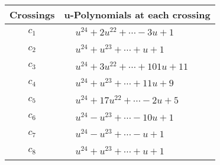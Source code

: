 \documentclass[1p]{elsarticle_modified}
\theoremstyle{definition}
\begin{document}
\begin{tabular}{m{50pt}|m{274pt}}
Crossings & \hspace{64pt}u-Polynomials at each crossing \\
\hline $$\begin{aligned}c_{1}\end{aligned}$$&$\begin{aligned}
&u^{24}+2 u^{22}+\cdots-3 u+1
\end{aligned}$\\
\hline $$\begin{aligned}c_{2}\end{aligned}$$&$\begin{aligned}
&u^{24}+u^{23}+\cdots+u+1
\end{aligned}$\\
\hline $$\begin{aligned}c_{3}\end{aligned}$$&$\begin{aligned}
&u^{24}+3 u^{22}+\cdots+101 u+11
\end{aligned}$\\
\hline $$\begin{aligned}c_{4}\end{aligned}$$&$\begin{aligned}
&u^{24}+u^{23}+\cdots+11 u+9
\end{aligned}$\\
\hline $$\begin{aligned}c_{5}\end{aligned}$$&$\begin{aligned}
&u^{24}+17 u^{22}+\cdots-2 u+5
\end{aligned}$\\
\hline $$\begin{aligned}c_{6}\end{aligned}$$&$\begin{aligned}
&u^{24}- u^{23}+\cdots-10 u+1
\end{aligned}$\\
\hline $$\begin{aligned}c_{7}\end{aligned}$$&$\begin{aligned}
&u^{24}- u^{23}+\cdots- u+1
\end{aligned}$\\
\hline $$\begin{aligned}c_{8}\end{aligned}$$&$\begin{aligned}
&u^{24}+u^{23}+\cdots+u+1
\end{aligned}$\\

\end{tabular}
\end{document}
